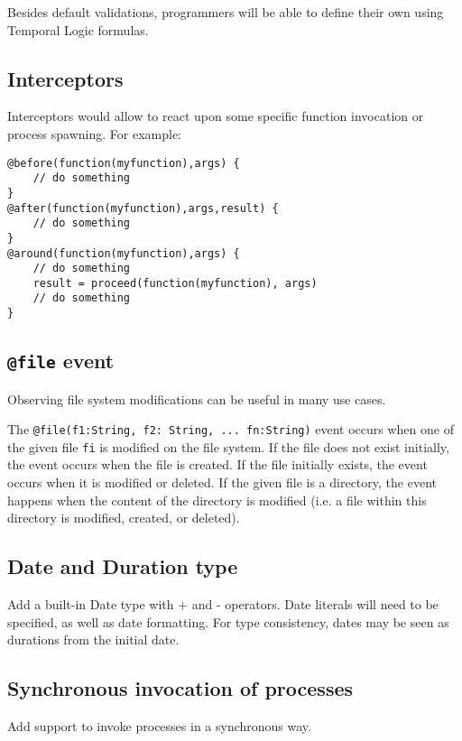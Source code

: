 \documentclass[11pt]{article}
\begin{document}
Besides default validations, programmers will be able to define their own using Temporal Logic formulas.

\subsection{Interceptors}

Interceptors would allow to react upon some specific function invocation or process spawning. For example:

\begin{lstlisting}[numbers=none]
@before(function(myfunction),args) {
	// do something
}
@after(function(myfunction),args,result) {
	// do something
}
@around(function(myfunction),args) {
	// do something
	result = proceed(function(myfunction), args)
	// do something
}
\end{lstlisting}

\subsection{\texttt{@file} event}

Observing file system modifications can be useful in many use cases.

The \texttt{@file(f1:String, f2: String, ... fn:String)} event occurs when one of the given file \texttt{fi} is modified on the file system. If the file does not exist initially, the event occurs when the file is created. If the file initially exists, the event occurs when it is modified or deleted. If the given file is a directory, the event happens when the content of the directory is modified (i.e. a file within this directory is modified, created, or deleted).

\subsection{Date and Duration type}

Add a built-in Date type with + and - operators. Date literals will need to be specified, as well as date formatting. For type consistency, dates may be seen as durations from the initial date.

\subsection{Synchronous invocation of processes}

Add support to invoke processes in a synchronous way.

\end{document}
